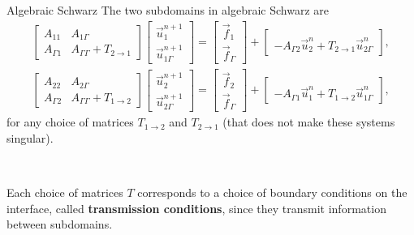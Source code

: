 \documentclass{beamer}
\begin{document}
\begin{frame}{Algebraic Schwarz}
The two subdomains in algebraic Schwarz are
\begin{align*}
	\begin{bmatrix} A_{11} & A_{1 \Gamma} \\ A_{\Gamma 1} & A_{\Gamma \Gamma} + T_{2 \to 1} \end{bmatrix}
                            \begin{bmatrix} \vec{u}_1^{n+1} \\ \vec{u}_{1 \Gamma}^{n+1} \end{bmatrix}
                            = \begin{bmatrix} \vec{f}_1 \\ \vec{f}_\Gamma \end{bmatrix}
                            + \begin{bmatrix} ~ \\ -A_{\Gamma 2} \vec{u}_2^n + T_{2 \to 1} \vec{u}_{2 \Gamma}^n \end{bmatrix}, \\
       \begin{bmatrix} A_{22} & A_{2 \Gamma} \\ A_{\Gamma 2} & A_{\Gamma \Gamma} + T_{1 \to 2} \end{bmatrix}
                            \begin{bmatrix} \vec{u}_2^{n+1} \\ \vec{u}_{2 \Gamma}^{n+1} \end{bmatrix}
                            = \begin{bmatrix} \vec{f}_2 \\ \vec{f}_\Gamma \end{bmatrix}
                            + \begin{bmatrix} ~ \\ -A_{\Gamma 1} \vec{u}_1^n + T_{1 \to 2} \vec{u}_{1 \Gamma}^n \end{bmatrix} ,
\end{align*}
for any choice of matrices $T_{1 \to 2}$ and $T_{2 \to 1}$ (that does not make these systems singular).

~

Each choice of matrices $T$ corresponds to a choice of boundary conditions on the interface, called \textbf{transmission conditions}, since they transmit information between subdomains.
\end{frame}
\end{document}
